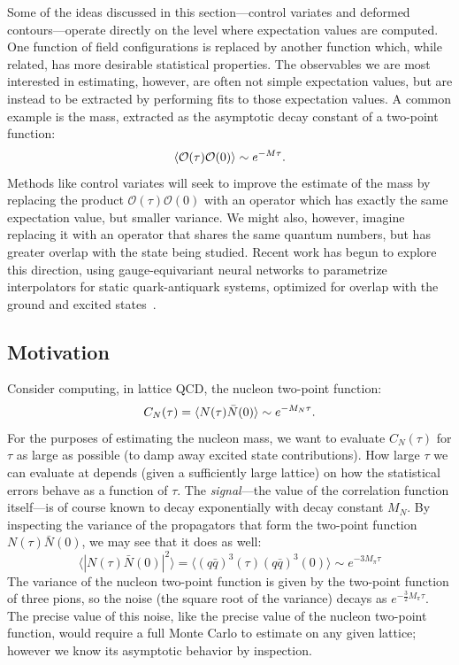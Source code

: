 \documentclass[12pt]{article}
\begin{document}
Some of the ideas discussed in this section---control variates and deformed contours---operate directly on the level where expectation values are computed. One function of field configurations is replaced by another function which, while related, has more desirable statistical properties. The observables we are most interested in estimating, however, are often not simple expectation values, but are instead to be extracted by performing fits to those expectation values. A common example is the mass, extracted as the asymptotic decay constant of a two-point function:
\begin{equation}
    \langle \mathcal O(\tau) \mathcal O(0)\rangle \sim e^{- M \tau}\text.
\end{equation}
Methods like control variates will seek to improve the estimate of the mass by replacing the product $\mathcal O(\tau) \mathcal O(0)$ with an operator which has exactly the same expectation value, but smaller variance. We might also, however, imagine replacing it with an operator that shares the same quantum numbers, but has greater overlap with the state being studied. Recent work has begun to explore this direction, using gauge-equivariant neural networks to parametrize interpolators for static quark-antiquark systems, optimized for overlap with the ground and excited states~\cite{Bellscheidt:2026rjh,Mayer-Steudte:2026vaf}.

\subsection{Motivation}
Consider computing, in lattice QCD, the nucleon two-point function:
\begin{equation}
C_N(\tau) = \langle N(\tau) \bar N(0)\rangle \sim e^{-M_N \tau}
\text.
\end{equation}
For the purposes of estimating the nucleon mass, we want to evaluate $C_N(\tau)$ for $\tau$ as large as possible (to damp away excited state contributions). How large $\tau$ we can evaluate at depends (given a sufficiently large lattice) on how the statistical errors behave as a function of $\tau$. The \emph{signal}---the value of the correlation function itself---is of course known to decay exponentially with decay constant $M_N$. By inspecting the variance of the propagators that form the two-point function $N(\tau) \bar N(0)$, we may see that it does as well:
\begin{equation}
    \langle |N(\tau) \bar N(0)|^2\rangle
    =
    \langle (q \bar q)^3(\tau) (q \bar q)^3(0)\rangle
    \sim e^{-3 M_\pi \tau}
\end{equation}
The variance of the nucleon two-point function is given by the two-point function of three pions, so the noise (the square root of the variance) decays as $e^{-\frac 3 2 M_\pi \tau}$.
The precise value of this noise, like the precise value of the nucleon two-point function, would require a full Monte Carlo to estimate on any given lattice; however we know its asymptotic behavior by inspection.
\end{document}
